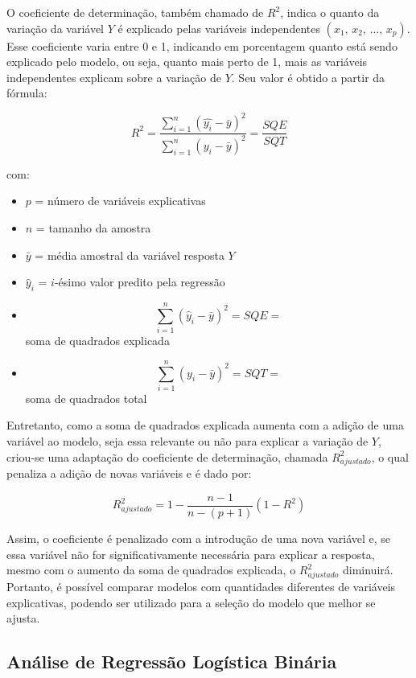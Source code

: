 \documentclass[
]{estat/estat}
\begin{document}
O coeficiente de determinação, também chamado de \(R^2\), indica o
quanto da variação da variável \(Y\) é explicado pelas variáveis
independentes \((x_1, \, x_2, \, \ldots, \, x_p)\). Esse coeficiente
varia entre 0 e 1, indicando em porcentagem quanto está sendo explicado
pelo modelo, ou seja, quanto mais perto de 1, mais as variáveis
independentes explicam sobre a variação de \(Y\). Seu valor é obtido a
partir da fórmula:

\[
R^2 = \frac{\displaystyle \sum^n_{i=1}\left(\hat{y_i} - \bar{y}\right)^2}{\displaystyle \sum^n_{i=1}\left(y_i - \bar{y}\right)^2} = \frac{SQE}{SQT}
\]

com:

\begin{itemize}
\item
  \(p\) = número de variáveis explicativas
\item
  \(n\) = tamanho da amostra
\item
  \(\bar{y}\) = média amostral da variável resposta \(Y\)
\item
  \(\hat{y}_i\) = \(i\)-ésimo valor predito pela regressão
\item
  \[\sum_{i=1}^{n} \left(\hat{y}_i - \bar{y}\right)^2 = SQE = \] soma de
  quadrados explicada
\item
  \[\sum_{i=1}^{n} \left(y_i - \bar{y}\right)^2 = SQT = \] soma de
  quadrados total
\end{itemize}

Entretanto, como a soma de quadrados explicada aumenta com a adição de
uma variável ao modelo, seja essa relevante ou não para explicar a
variação de \(Y\), criou-se uma adaptação do coeficiente de
determinação, chamada \(R^2_{ajustado}\), o qual penaliza a adição de
novas variáveis e é dado por:

\[
R^2_{ajustado} = 1 - \frac{n-1}{n-(p+1)} \left(1-R^2\right)
\]

Assim, o coeficiente é penalizado com a introdução de uma nova variável
e, se essa variável não for significativamente necessária para explicar
a resposta, mesmo com o aumento da soma de quadrados explicada, o
\(R^2_{ajustado}\) diminuirá. Portanto, é possível comparar modelos com
quantidades diferentes de variáveis explicativas, podendo ser utilizado
para a seleção do modelo que melhor se ajusta.

\subsection{Análise de Regressão Logística
Binária}\label{anuxe1lise-de-regressuxe3o-loguxedstica-binuxe1ria}
\end{document}
